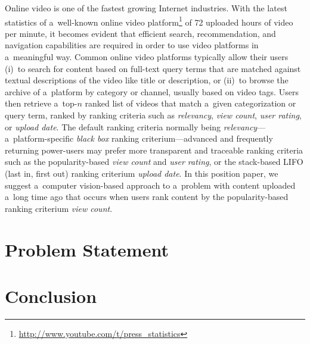 \documentclass[runningheads,a4paper]{llncs}
\begin{document}
Online video is one of the fastest growing Internet industries.
With the latest statistics of a~well-known online video
platform\footnote{\url{http://www.youtube.com/t/press_statistics}}
of 72 uploaded hours of video per minute,
it becomes evident that efficient search, recommendation, and
navigation capabilities are required in order to use 
video platforms in a~meaningful way. 
Common online video platforms typically allow their users
(i)~to search for content based on full-text query terms
that are matched against textual descriptions
of the video like title or description,
or (ii)~to browse the archive of a~platform by category or channel,
usually based on video tags.
Users then retrieve a~top-$n$ ranked list of videos
that match a~given categorization
or query term, ranked by ranking criteria such as
\emph{relevancy}, \emph{view count},
\emph{user rating}, or \emph{upload date}.
The default ranking criteria normally being
\emph{relevancy}---a~platform-specific \emph{black box}
ranking criterium---advanced and frequently returning power-users
may prefer more transparent and traceable ranking criteria
such as the popularity-based \emph{view count}
and \emph{user rating}, or the stack-based
LIFO (last in, first out) ranking criterium \emph{upload date}.
In this position paper, we suggest a~computer vision-based
approach to a~problem with content uploaded a~long time ago
that occurs when users rank content
by the popularity-based ranking criterium \emph{view count}.

\section{Problem Statement}

\section{Conclusion}


%
\end{document}
